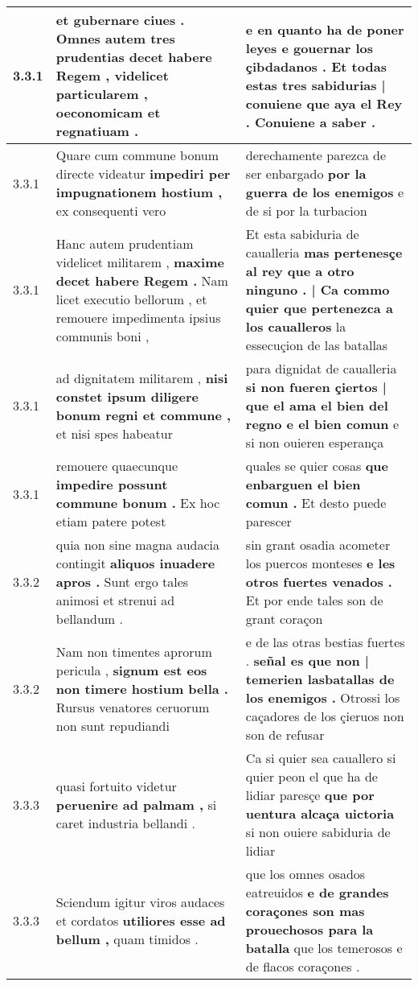 \begin{tabular}{|p{1cm}|p{6.5cm}|p{6.5cm}|}
3.3.1 & et gubernare ciues . \textbf{ Omnes autem tres prudentias decet habere Regem , } videlicet particularem , oeconomicam et regnatiuam . & e en quanto ha de poner leyes e gouernar los çibdadanos . \textbf{ Et todas estas tres sabidurias | conuiene que aya el Rey . } Conuiene a saber . \\\hline
3.3.1 & Quare cum commune bonum directe videatur \textbf{ impediri per impugnationem hostium , } ex consequenti vero & derechamente parezca de ser enbargado \textbf{ por la guerra de los enemigos } e de si por la turbacion \\\hline
3.3.1 & Hanc autem prudentiam videlicet militarem , \textbf{ maxime decet habere Regem . } Nam licet executio bellorum , et remouere impedimenta ipsius communis boni , & Et esta sabiduria de caualleria \textbf{ mas pertenesçe al rey que a otro ninguno . | Ca commo quier que pertenezca a los caualleros } la essecuçion de las batallas \\\hline
3.3.1 & ad dignitatem militarem , \textbf{ nisi constet ipsum diligere bonum regni et commune , } et nisi spes habeatur & para dignidat de caualleria \textbf{ si non fueren çiertos | que el ama el bien del regno e el bien comun } e si non ouieren esperança \\\hline
3.3.1 & remouere quaecunque \textbf{ impedire possunt commune bonum . } Ex hoc etiam patere potest & quales se quier cosas \textbf{ que enbarguen el bien comun . } Et desto puede parescer \\\hline
3.3.2 & quia non sine magna audacia contingit \textbf{ aliquos inuadere apros . } Sunt ergo tales animosi et strenui ad bellandum . & sin grant osadia acometer los puercos monteses \textbf{ e les otros fuertes venados . } Et por ende tales son de grant coraçon \\\hline
3.3.2 & Nam non timentes aprorum pericula , \textbf{ signum est eos non timere hostium bella . } Rursus venatores ceruorum non sunt repudiandi & e de las otras bestias fuertes . \textbf{ señal es que non | temerien lasbatallas de los enemigos . } Otrossi los caçadores de los çieruos non son de refusar \\\hline
3.3.3 & quasi fortuito videtur \textbf{ peruenire ad palmam , } si caret industria bellandi . & Ca si quier sea cauallero si quier peon el que ha de lidiar paresçe \textbf{ que por uentura alcaça uictoria } si non ouiere sabiduria de lidiar \\\hline
3.3.3 & Sciendum igitur viros audaces et cordatos \textbf{ utiliores esse ad bellum , } quam timidos . & que los omnes osados eatreuidos \textbf{ e de grandes coraçones son mas prouechosos para la batalla } que los temerosos e de flacos coraçones . \\\hline

\end{tabular}
